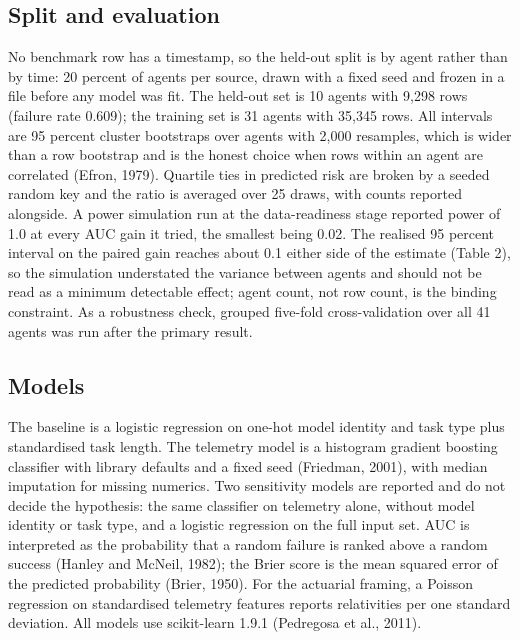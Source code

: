 \documentclass[
  11pt,
  a4paper,
]{article}
\begin{document}
\hypertarget{split-and-evaluation}{%
\subsection{Split and evaluation}\label{split-and-evaluation}}

No benchmark row has a timestamp, so the held-out split is by agent
rather than by time: 20 percent of agents per source, drawn with a fixed
seed and frozen in a file before any model was fit. The held-out set is
10 agents with 9,298 rows (failure rate 0.609); the training set is 31
agents with 35,345 rows. All intervals are 95 percent cluster bootstraps
over agents with 2,000 resamples, which is wider than a row bootstrap
and is the honest choice when rows within an agent are correlated
(Efron, 1979). Quartile ties in predicted risk are broken by a seeded
random key and the ratio is averaged over 25 draws, with counts reported
alongside. A power simulation run at the data-readiness stage reported
power of 1.0 at every AUC gain it tried, the smallest being 0.02. The
realised 95 percent interval on the paired gain reaches about 0.1 either
side of the estimate (Table 2), so the simulation understated the
variance between agents and should not be read as a minimum detectable
effect; agent count, not row count, is the binding constraint. As a
robustness check, grouped five-fold cross-validation over all 41 agents
was run after the primary result.

\hypertarget{models}{%
\subsection{Models}\label{models}}

The baseline is a logistic regression on one-hot model identity and task
type plus standardised task length. The telemetry model is a histogram
gradient boosting classifier with library defaults and a fixed seed
(Friedman, 2001), with median imputation for missing numerics. Two
sensitivity models are reported and do not decide the hypothesis: the
same classifier on telemetry alone, without model identity or task type,
and a logistic regression on the full input set. AUC is interpreted as
the probability that a random failure is ranked above a random success
(Hanley and McNeil, 1982); the Brier score is the mean squared error of
the predicted probability (Brier, 1950). For the actuarial framing, a
Poisson regression on standardised telemetry features reports
relativities per one standard deviation. All models use scikit-learn
1.9.1 (Pedregosa et al., 2011).
\end{document}
